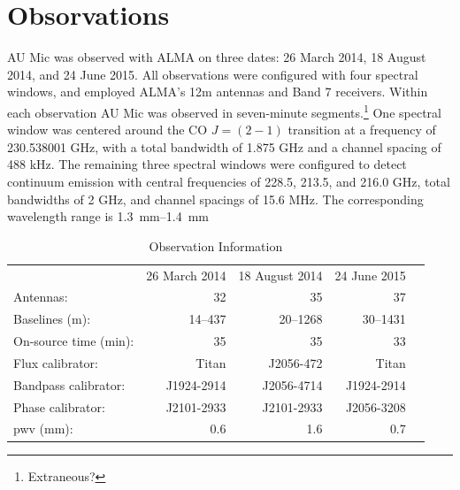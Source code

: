 \documentclass[12pt,oneside]{book}
\begin{document}
% 
% 
% 
\mainmatter 
% 

\chapter{Obsorvations}
\label{chap: observations}
AU Mic was observed  with ALMA on three dates: 26 March 2014, 18 August 2014, and 24 June 2015. 
All observations were configured with four spectral windows, and employed ALMA's 12m antennas and Band 7 receivers. 
Within each observation AU Mic was observed in seven-minute segments.\footnote{Extraneous?}
One spectral window was centered around the CO $J = (2-1)$ transition at a frequency of 230.538001 GHz, with a total bandwidth of 1.875 GHz and a channel spacing of 488 kHz.
The remaining three spectral windows were configured to detect continuum emission with central frequencies of 228.5, 213.5, and 216.0 GHz, total bandwidths of 2 GHz, and channel spacings of 15.6 MHz. The corresponding wavelength range is \SIrange{1.3}{1.4}{\mm}

\begin{table}	
  \centering
	\caption{Observation Information}
  \label{tab:observations}
  \begin{tabular}{lrrrr}
    \toprule
    & 26 March 2014 & 18 August 2014 & 24 June 2015 \\
    \cmidrule(lr){2-4}
    Antennas: & 32 & 35 & 37 \\
    Baselines (m): & 14--437 & 20--1268 & 30--1431 \\
    On-source time (min): & 35 & 35 & 33 \\
    Flux calibrator: & Titan & J2056-472 & Titan \\
    Bandpass calibrator: & J1924-2914 & J2056-4714 & J1924-2914 \\
    Phase calibrator: & J2101-2933 & J2101-2933 & J2056-3208  \\
    pwv (mm): & 0.6 & 1.6 & 0.7 \\
    \bottomrule
  \end{tabular}
\end{table}
\end{document}

